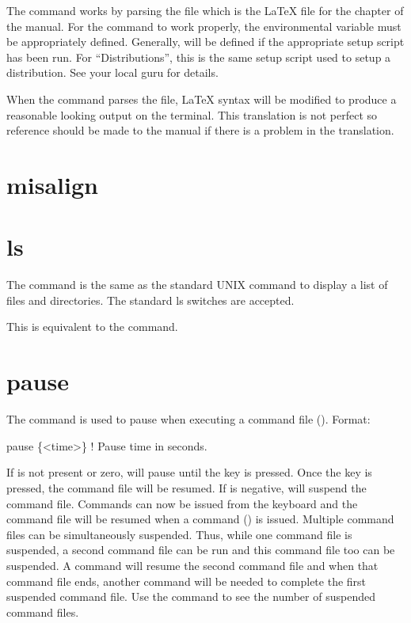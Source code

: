 The  command works by parsing the file  which is the
LaTeX file for the  chapter of the \tao manual. For the  command to work
properly, the environmental variable  must be appropriately defined. Generally,
 will be defined if the appropriate \bmad setup script has been run. For
``Distributions'', this is the same setup script used to setup a distribution. See your local \bmad
guru for details.

When the  command parses the  file, LaTeX syntax will be
modified to produce a reasonable looking output on the terminal. This translation is not perfect so
reference should be made to the \tao manual if there is a problem in the translation.

\section{misalign}
\label{s:misalign}

\section{ls}
\label{s:ls}

The  command is the same as the standard UNIX  command to display a list of files and
directories. The standard ls switches are accepted.

This is equivalent to the  command.

\section{pause}
\label{s:pause}

The  command is used to pause \tao when executing a command file
(). Format:
\begin{example}
  pause \{<time>\} ! Pause time in seconds.
\end{example}

\vskip 10pt
If  is not present or zero, \tao will pause until the  key is pressed. Once the
 key is pressed, the command file will be resumed. If  is negative, \tao will
suspend the command file. Commands can now be issued from the keyboard and the command file will be
resumed when a  command () is issued. Multiple command files can be
simultaneously suspended.  Thus, while one command file is suspended, a second command file can be
run and this command file too can be suspended. A  command will resume the second
command file and when that command file ends, another  command will be needed to
complete the first suspended command file. Use the  command to see the number of
suspended command files.

